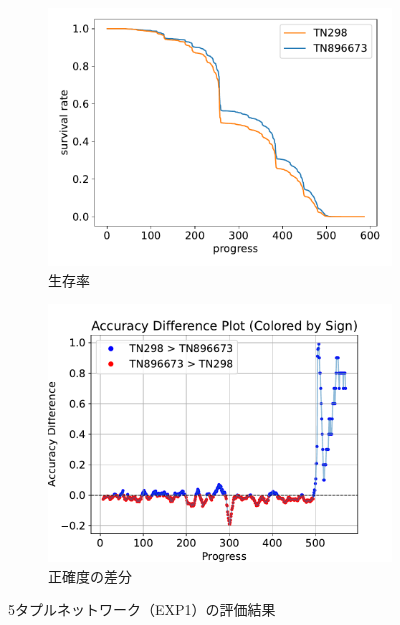 \begin{figure}[t]
\begin{subfigure}[b]{0.49\linewidth}
    \includegraphics[width=\linewidth]{pdf/compare/merged_NT5_OI1200_compare/survival.pdf}
    \caption{生存率}
    \label{fig:nt5_exp1_survival}
\end{subfigure}
\begin{subfigure}[b]{0.49\linewidth}
    \includegraphics[width=\linewidth]{pdf/compare/merged_NT5_OI1200_compare/acc_diff_plot.pdf}
    \caption{正確度の差分}
    \label{fig:nt5_exp1_acc_diff}
\end{subfigure}
\caption{5タプルネットワーク（EXP1）の評価結果}
\label{fig:nt5_exp1_results}
\end{figure}
    

